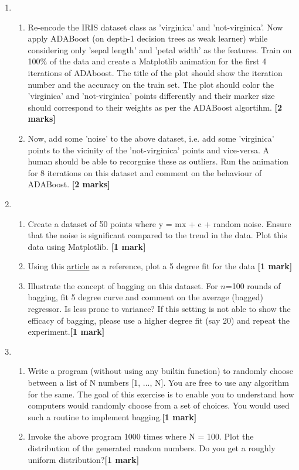 \documentclass[colorlinks]{article}
\begin{document}
\begin{enumerate}
\item \begin{enumerate}
	\item Re-encode the IRIS dataset class as 'virginica' and 'not-virginica'. Now apply ADABoost (on depth-1 decision trees as weak learner) while considering only 'sepal length' and 'petal width' as the features. Train on 100\% of the data and create a Matplotlib animation for the first 4 iterations of ADAboost. The title of the plot should show the iteration number and the accuracy on the train set. The plot should color the 'virginica' and 'not-virginica' points differently and their marker size should correspond to their weights as per the ADABoost algortihm. \textbf{[2 marks]}
	\item Now, add some 'noise' to the above dataset, i.e. add some 'virginica' points to the vicinity of the 'not-virginica' points and vice-versa. A human should be able to recorgnise these as outliers. Run the animation for 8 iterations on this dataset and comment on the behaviour of ADABoost. \textbf{[2 marks]}
\end{enumerate}


\item \begin{enumerate}
	\item Create a dataset of 50 points where y = mx + c +  random noise. Ensure that the noise is significant compared to the trend in the data. Plot this data using Matplotlib. \textbf{[1 mark]}
	\item Using this \href{https://www.scipy-lectures.org/intro/numpy/auto_examples/plot_polyfit.html}{article} as a reference, plot a 5 degree fit for the data \textbf{[1 mark]}
	\item Illustrate the concept of bagging on this dataset. For $n$=100 rounds of bagging, fit 5 degree curve and comment on the average (bagged) regressor. Is less prone to variance? If this setting is not able to show the efficacy of bagging, please use a higher degree fit (say 20) and repeat the experiment.\textbf{[1 mark]}
\end{enumerate}


\item \begin{enumerate}
	\item Write a program (without using any builtin function) to randomly choose between a list of N numbers [1, ..., N]. You are free to use any algorithm for the same. The goal of this exercise is to enable you to understand how computers would randomly choose from a set of choices. You would used such a routine to implement bagging.\textbf{[1 mark]} 
	\item Invoke the above program 1000 times where N = 100. Plot the distribution of the generated random numbers. Do you get a roughly uniform distribution?\textbf{[1 mark]} 
\end{enumerate}



	
	
	

\end{enumerate}
\end{document}
